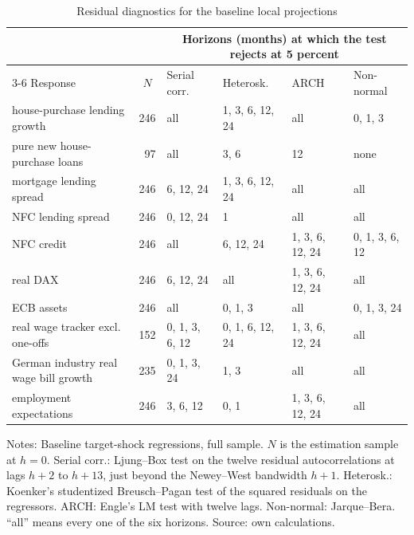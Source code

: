 \begin{table}[htbp]
  \centering
  \caption{Residual diagnostics for the baseline local projections}
  \label{tab:residual-diagnostics}
  \footnotesize
  \setlength{\tabcolsep}{4pt}
  \begin{tabular}{@{}l r l l l l@{}}
    \toprule
    & & \multicolumn{4}{c}{Horizons (months) at which the test rejects at 5 percent} \\
    \cmidrule(lr){3-6}
    Response & \multicolumn{1}{c}{$N$} & Serial corr. & Heterosk. & ARCH & Non-normal \\
    \midrule
    house-purchase lending growth & 246 & all & 1, 3, 6, 12, 24 & all & 0, 1, 3 \\
    pure new house-purchase loans & 97 & all & 3, 6 & 12 & none \\
    mortgage lending spread & 246 & 6, 12, 24 & 1, 3, 6, 12, 24 & all & all \\
    NFC lending spread & 246 & 0, 12, 24 & 1 & all & all \\
    NFC credit & 246 & all & 6, 12, 24 & 1, 3, 6, 12, 24 & 0, 1, 3, 6, 12 \\
    real DAX & 246 & 6, 12, 24 & all & 1, 3, 6, 12, 24 & all \\
    ECB assets & 246 & all & 0, 1, 3 & all & 0, 1, 3, 24 \\
    real wage tracker excl. one-offs & 152 & 0, 1, 3, 6, 12 & 0, 1, 6, 12, 24 & 1, 3, 6, 12, 24 & all \\
    German industry real wage bill growth & 235 & 0, 1, 3, 24 & 1, 3 & all & all \\
    employment expectations & 246 & 3, 6, 12 & 0, 1 & 1, 3, 6, 12, 24 & all \\
    \bottomrule
  \end{tabular}
  \vspace{0.3em}
  \begin{minipage}{\textwidth}\footnotesize{}
  Notes: Baseline target-shock regressions, full sample. $N$ is the estimation sample at $h=0$.
  Serial corr.: Ljung--Box test on the twelve residual autocorrelations at lags $h+2$ to $h+13$,
  just beyond the Newey--West bandwidth $h+1$. Heterosk.: Koenker's studentized Breusch--Pagan
  test of the squared residuals on the regressors. ARCH: Engle's LM test with twelve lags.
  Non-normal: Jarque--Bera. ``all'' means every one of the six horizons. Source: own calculations.
  \end{minipage}
\end{table}
